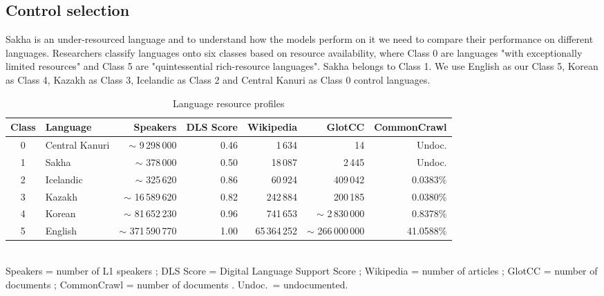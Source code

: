 \documentclass[11pt]{article}
\begin{document}
\subsection{Control selection}
Sakha is an under-resourced language and to understand how the models perform on it we need to compare their performance on different languages.
Researchers classify languages onto six classes based on resource availability, where Class 0 are languages "with exceptionally limited resources" and Class 5 are "quintessential rich-resource languages"\cite{joshi-etal-2020-state}.
Sakha belongs to Class 1.
We use English as our Class 5, Korean as Class 4, Kazakh as Class 3, Icelandic as Class 2 and Central Kanuri as Class 0 control languages.

\begin{table}[ht]
    \centering
    \caption{Language resource profiles}
    \label{tab:language_resources}
    \small
    \begin{tabular*}{\textwidth}{@{\extracolsep{\fill}}clrrrrr@{}}
        \toprule
        \textbf{Class} & \textbf{Language} & \textbf{Speakers}& \textbf{DLS Score} & \textbf{Wikipedia} & \textbf{GlotCC} & \textbf{CommonCrawl} \\
        \midrule
        0 & Central Kanuri & $\sim$ 9\,298\,000 & 0.46 & 1\,634 & 14 & Undoc. \\
        1 & Sakha & $\sim$ 378\,000 & 0.50 & 18\,087 & 2\,445 & Undoc. \\
        2 & Icelandic & $\sim$ 325\,620 & 0.86 & 60\,924 & 409\,042 & 0.0383\% \\
        3 & Kazakh & $\sim$ 16\,589\,620 & 0.82 & 242\,884 & 200\,185 & 0.0380\% \\
        4 & Korean & $\sim$ 81\,652\,230 & 0.96 & 741\,653 & $\sim$ 2\,830\,000 & 0.8378\% \\
        5 & English & $\sim$ 371\,590\,770 & 1.00 & 65\,364\,252 & $\sim$ 266\,000\,000 & 41.0588\% \\
        \bottomrule
    \end{tabular*}
    \vspace{2pt}\\
    \small Speakers = number of L1 speakers \cite{ethnologue2026}; DLS Score = Digital Language Support Score \cite{ethnologue2026, simons-etal-2022-assessing}; Wikipedia = number of articles \cite{MetaListWikipedias2026}; GlotCC = number of documents \cite{kargaran2024glotcc}; CommonCrawl = number of documents \cite{CommonCrawlStats2026}. Undoc.\ = undocumented.
\end{table}
\end{document}
